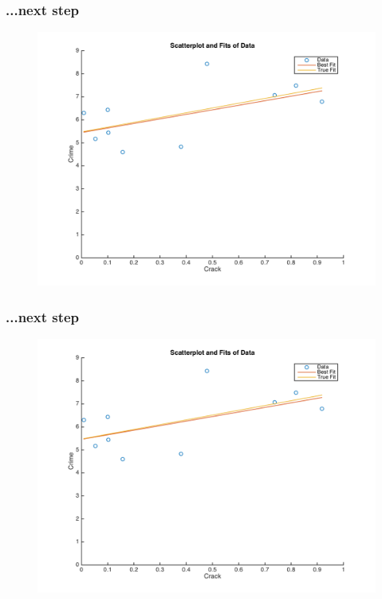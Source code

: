 \documentclass{beamer}
\begin{document}
\begin{frame}
\frametitle[alignment=center]{...next step}
\begin{figure}
\centering
\includegraphics[scale=0.5]{Newton_OLS_Figure_20.png}
\end{figure}
\end{frame}

\begin{frame}
\frametitle[alignment=center]{...next step}
\begin{figure}
\centering
\includegraphics[scale=0.5]{Newton_OLS_Figure_21.png}
\end{figure}
\end{frame}
\end{document}
